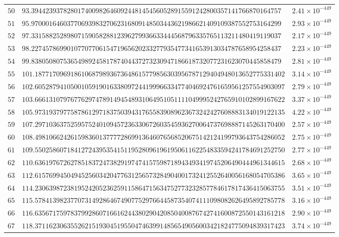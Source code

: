 \documentclass[12pt,reqno]{amsart}
\theoremstyle{plain}
\theoremstyle{definition}
\theoremstyle{remark}
\begin{document}
\begin{longtable}{clc}
$50$ & $93.3944239378280174009826460924481454560528915591242800357141766870164757$ & $2.41 \times 10^{-449}$ \\
$51$ & $95.9700016460377069398327062316809148503443621986621409109387552753164299$ & $2.93 \times 10^{-449}$ \\
$52$ & $97.3315882528980715905828812396279936633444568796335765113211480419119037$ & $2.17 \times 10^{-449}$ \\
$53$ & $98.2274578699010770770615471965620233277935477341653913034787658954258437$ & $2.23 \times 10^{-449}$ \\
$54$ & $99.8380508075365498924581787404437273230947186618732077231623070445858479$ & $2.81 \times 10^{-449}$ \\
$55$ & $101.1877170969186106879893673648615779856303956787129404948013652775331402$ & $3.14 \times 10^{-449}$ \\
$56$ & $102.6052879410500105919016338097244199966334774046924761659561257554903097$ & $2.79 \times 10^{-449}$ \\
$57$ & $103.6661310797677629747891494548931064951051111049995242765910102899167622$ & $3.37 \times 10^{-449}$ \\
$58$ & $105.9731937977587861297183750394317655839089623673242427608883134019122135$ & $4.22 \times 10^{-449}$ \\
$59$ & $107.2971036375259575240109457236330672603545936270064737698887145263170400$ & $2.57 \times 10^{-449}$ \\
$60$ & $108.4981066242615983601377772869913646076568520675142124199793643754286052$ & $2.75 \times 10^{-449}$ \\
$61$ & $109.5502586071841272439535415119528096196195061162254833594241784691252750$ & $2.77 \times 10^{-449}$ \\
$62$ & $110.6361976726278518372473829197474157598718943493419745206490444961344615$ & $2.68 \times 10^{-449}$ \\
$63$ & $112.6157699450494525603420477631256573284904001732412552640056168054705386$ & $3.65 \times 10^{-449}$ \\
$64$ & $114.2306398723819524205236259115864715634752773232857784617817436415063755$ & $3.51 \times 10^{-449}$ \\
$65$ & $115.5784139823770731492864674907752976644587354074111098082626495892785778$ & $3.16 \times 10^{-449}$ \\
$66$ & $116.6356717597837992860716616244380290420850400876742741600872550143161218$ & $2.90 \times 10^{-449}$ \\
$67$ & $118.3711623063552621519304519550474639914856549056003421824775094839317423$ & $3.74 \times 10^{-449}$ \\

\end{longtable}
\end{document}
